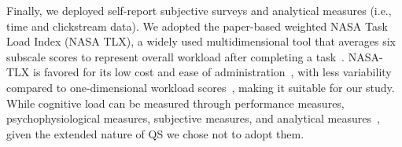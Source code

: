 Finally, we deployed self-report subjective surveys and analytical measures (i.e., time and clickstream data). We adopted the paper-based weighted NASA Task Load Index (NASA TLX), a widely used multidimensional tool that averages six subscale scores to represent overall workload after completing a task~\cite{hart1988development, hartNasaTaskLoadIndex2006, cain2007review}. NASA-TLX is favored for its low cost and ease of administration~\cite{gaoMentalWorkloadMeasurement2013}, with less variability compared to one-dimensional workload scores~\cite{rubioEvaluationSubjectiveMental2004}, making it suitable for our study. While cognitive load can be measured through performance measures, psychophysiological measures, subjective measures, and analytical measures~\cite{gaoMentalWorkloadMeasurement2013}, given the extended nature of QS we chose not to adopt them.







